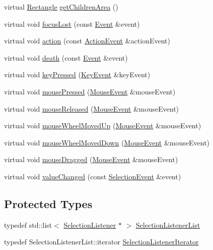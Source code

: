 \begin{DoxyCompactItemize}
\item 
virtual \hyperlink{classgcn_1_1Rectangle}{Rectangle} \hyperlink{classgcn_1_1DropDown_ad61f89e8985a3a3be217dd15e199633d}{get\+Children\+Area} ()
\item 
virtual void \hyperlink{classgcn_1_1DropDown_a688cf78090ce646ea35e1ca00a441b12}{focus\+Lost} (const \hyperlink{classgcn_1_1Event}{Event} \&event)
\item 
virtual void \hyperlink{classgcn_1_1DropDown_aed63325d931d3d9d3df7400bd3b89f3e}{action} (const \hyperlink{classgcn_1_1ActionEvent}{Action\+Event} \&action\+Event)
\item 
virtual void \hyperlink{classgcn_1_1DropDown_a8f6402e1ad3ac77b7db296bbd77a7494}{death} (const \hyperlink{classgcn_1_1Event}{Event} \&event)
\item 
virtual void \hyperlink{classgcn_1_1DropDown_a10e7ba776f5c93185c9c8a18b9c3bfa6}{key\+Pressed} (\hyperlink{classgcn_1_1KeyEvent}{Key\+Event} \&key\+Event)
\item 
virtual void \hyperlink{classgcn_1_1DropDown_a3865e886c7e7f475d49dbae1772805e9}{mouse\+Pressed} (\hyperlink{classgcn_1_1MouseEvent}{Mouse\+Event} \&mouse\+Event)
\item 
virtual void \hyperlink{classgcn_1_1DropDown_ac62161f8fc0cfb09d901a9376ae8d416}{mouse\+Released} (\hyperlink{classgcn_1_1MouseEvent}{Mouse\+Event} \&mouse\+Event)
\item 
virtual void \hyperlink{classgcn_1_1DropDown_aaee24c3f98bff6165b4fff5fd0a433c1}{mouse\+Wheel\+Moved\+Up} (\hyperlink{classgcn_1_1MouseEvent}{Mouse\+Event} \&mouse\+Event)
\item 
virtual void \hyperlink{classgcn_1_1DropDown_ae84a6afe8d813f32cafbf774eebae6b2}{mouse\+Wheel\+Moved\+Down} (\hyperlink{classgcn_1_1MouseEvent}{Mouse\+Event} \&mouse\+Event)
\item 
virtual void \hyperlink{classgcn_1_1DropDown_a1cef091cc5cf19aa64171276e787ad72}{mouse\+Dragged} (\hyperlink{classgcn_1_1MouseEvent}{Mouse\+Event} \&mouse\+Event)
\item 
virtual void \hyperlink{classgcn_1_1DropDown_a76129029923e0c520b1ade9f242c09e3}{value\+Changed} (const \hyperlink{classgcn_1_1SelectionEvent}{Selection\+Event} \&event)
\end{DoxyCompactItemize}
\subsection*{Protected Types}
\begin{DoxyCompactItemize}
\item 
typedef std\+::list$<$ \hyperlink{classgcn_1_1SelectionListener}{Selection\+Listener} $\ast$ $>$ \hyperlink{classgcn_1_1DropDown_a04c257fcc8360fdff851c66a8ada149e}{Selection\+Listener\+List}
\item 
typedef Selection\+Listener\+List\+::iterator \hyperlink{classgcn_1_1DropDown_a836c8426a53976c1fbecad118ae72ea7}{Selection\+Listener\+Iterator}
\end{DoxyCompactItemize}

